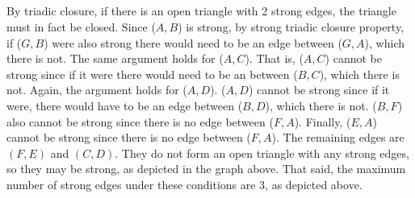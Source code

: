\documentclass[12pt]{article}
\begin{document}
\subsection{}
By triadic closure, if there is an open triangle with 2 strong edges, the triangle must in fact be closed. Since ($A,B$) is strong, by strong triadic closure property, if ($G,B$) were also strong there would need to be an edge between ($G,A$), which there is not. The same argument holds for ($A,C$). That is, ($A,C$) cannot be strong since if it were there would need to be an between ($B,C$), which there is not. Again, the argument holds for ($A,D$). ($A,D$) cannot be strong since if it were, there would have to be an edge between ($B,D$), which there is not. ($B,F$) also cannot be strong since there is no edge between ($F,A$). Finally, ($E,A$) cannot be strong since there is no edge between ($F,A$). The remaining edges are $(F,E)$ and $(C,D)$. They do not form an open triangle with any strong edges, so they may be strong, as depicted in the graph above. That said, the maximum number of strong edges under these conditions are 3, as depicted above.
\newpage
\end{document}
